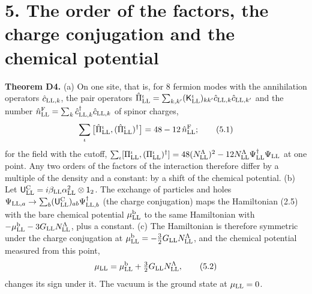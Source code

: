 \documentclass[
  10pt,
]{article}
\begin{document}
\hypertarget{the-order-of-the-factors-the-charge-conjugation-and-the-chemical-potential}{%
\section{5. The order of the factors, the charge conjugation and the
chemical
potential}\label{the-order-of-the-factors-the-charge-conjugation-and-the-chemical-potential}}

\textbf{Theorem D4.} (a) On one site, that is, for 8 fermion modes with
the annihilation operators \(\hat c_{{\rm LL},k}\), the pair operators
\(\hat\Pi^\iota_{\rm LL}=\sum_{k,k'}(\mathsf K^\iota_{\rm LL})_{kk'}\hat c_{{\rm LL},k}\hat c_{{\rm LL},k'}\)
and the number
\(\hat n^{\rm F}_{\rm LL}=\sum_k\hat c^\dagger_{{\rm LL},k}\hat c_{{\rm LL},k}\)
of spinor charges,
\[\sum_\iota\big[\hat\Pi^\iota_{\rm LL},(\hat\Pi^\iota_{\rm LL})^\dagger\big]=48-12\,\hat n^{\rm F}_{\rm LL};\tag{5.1}\]
for the field with the cutoff,
\(\sum_\iota[\Pi^\iota_{\rm LL},(\Pi^\iota_{\rm LL})^\dagger]=48(N^\Lambda_{\rm LL})^2-12N^\Lambda_{\rm LL}\Psi^\dagger_{\rm LL}\Psi_{\rm LL}\)
at one point. Any two orders of the factors of the interaction therefore
differ by a multiple of the density and a constant: by a shift of the
chemical potential. (b) Let
\(\mathsf U^{\rm C}_{\rm LL}=i\beta_{\rm LL}\alpha^2_{\rm LL}\otimes\mathsf 1_2\).
The exchange of particles and holes
\(\Psi_{{\rm LL},a}\to\sum_b(\mathsf U^{\rm C}_{\rm LL})_{ab}\Psi^\dagger_{{\rm LL},b}\)
(the charge conjugation) maps the Hamiltonian (2.5) with the bare
chemical potential \(\mu^{\rm b}_{\rm LL}\) to the same Hamiltonian with
\(-\mu^{\rm b}_{\rm LL}-3G_{\rm LL}N^\Lambda_{\rm LL}\), plus a
constant. (c) The Hamiltonian is therefore symmetric under the charge
conjugation at
\(\mu^{\rm b}_{\rm LL}=-\tfrac32G_{\rm LL}N^\Lambda_{\rm LL}\), and the
chemical potential measured from this point,
\[\mu_{\rm LL}=\mu^{\rm b}_{\rm LL}+\tfrac32G_{\rm LL}N^\Lambda_{\rm LL},\tag{5.2}\]
changes its sign under it. The vacuum is the ground state at
\(\mu_{\rm LL}=0\).
\end{document}
